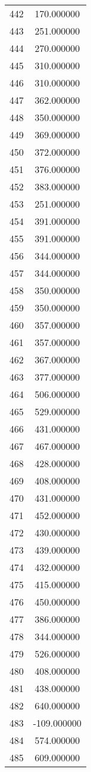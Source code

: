 \documentclass[12pt]{article}
\begin{document}
\begin{longtable}{@{}cc@{}}
442 & 170.000000 \\
443 & 251.000000 \\
444 & 270.000000 \\
445 & 310.000000 \\
446 & 310.000000 \\
447 & 362.000000 \\
448 & 350.000000 \\
449 & 369.000000 \\
450 & 372.000000 \\
451 & 376.000000 \\
452 & 383.000000 \\
453 & 251.000000 \\
454 & 391.000000 \\
455 & 391.000000 \\
456 & 344.000000 \\
457 & 344.000000 \\
458 & 350.000000 \\
459 & 350.000000 \\
460 & 357.000000 \\
461 & 357.000000 \\
462 & 367.000000 \\
463 & 377.000000 \\
464 & 506.000000 \\
465 & 529.000000 \\
466 & 431.000000 \\
467 & 467.000000 \\
468 & 428.000000 \\
469 & 408.000000 \\
470 & 431.000000 \\
471 & 452.000000 \\
472 & 430.000000 \\
473 & 439.000000 \\
474 & 432.000000 \\
475 & 415.000000 \\
476 & 450.000000 \\
477 & 386.000000 \\
478 & 344.000000 \\
479 & 526.000000 \\
480 & 408.000000 \\
481 & 438.000000 \\
482 & 640.000000 \\
483 & -109.000000 \\
484 & 574.000000 \\
485 & 609.000000 \\

\end{longtable}
\end{document}
